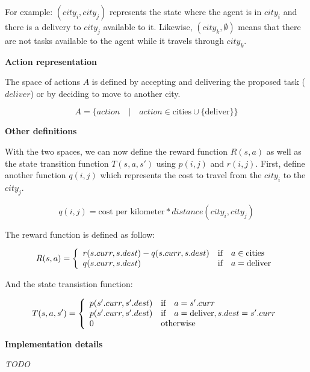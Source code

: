 \documentclass[11pt,a4paper]{article}
\begin{document}
For example: $(city_i, city_j)$ represents the state where the agent is
in $city_i$ and there is a delivery to $city_j$ available to it. Likewise,
$(city_k, \emptyset)$ means that there are not tasks available to the agent
while it travels through $city_k$.

\medskip
\textbf{Action representation}

The space of actions $A$ is defined by accepting and delivering the proposed task ($deliver$) or by deciding to move to another city.

$$ A = \{ action \quad | \quad action \in \text{cities} \cup \{\text{deliver}\} \} $$

\medskip
\textbf{Other definitions}

With the two spaces, we can now define the reward function $R(s,a)$ as well as the state transition function $T(s,a,s')$ using $p(i,j)$ and $r(i,j)$. First, define another function $q(i,j)$ which represents the cost to travel from
the $city_i$ to the $city_j$.

$$ q(i, j) = \text{cost per kilometer} * distance(city_i, city_j) $$

The reward function is defined as follow:

$$ R(s, a) = \left\{
    \begin{array}{l l}
        r(s.curr, s.dest) - q(s.curr, s.dest) & \text{if} \quad a \in \text{cities} \\
        q(s.curr, s.dest) & \text{if} \quad a = \text{deliver}
    \end{array} \right. $$

And the state transistion function:


$$ T(s, a, s') = \left\{
    \begin{array}{l l}
        p(s'.curr, s'.dest) & \text{if} \quad a = s'.curr \\
        p(s'.curr, s'.dest) & \text{if} \quad a = \text{deliver}, s.dest = s'.curr \\
        0 & \text{otherwise}
    \end{array} \right. $$


\bigskip
\textbf{Implementation details}

\emph{TODO}
\end{document}

